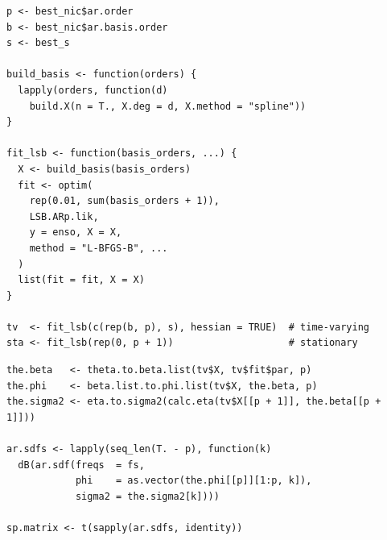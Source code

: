 \documentclass{article}
\begin{document}
\vspace{0.25cm}


\begin{lstlisting}
p <- best_nic$ar.order
b <- best_nic$ar.basis.order
s <- best_s

build_basis <- function(orders) {
  lapply(orders, function(d)
    build.X(n = T., X.deg = d, X.method = "spline"))
}

fit_lsb <- function(basis_orders, ...) {
  X <- build_basis(basis_orders)
  fit <- optim(
    rep(0.01, sum(basis_orders + 1)),
    LSB.ARp.lik,
    y = enso, X = X,
    method = "L-BFGS-B", ...
  )
  list(fit = fit, X = X)
}

tv  <- fit_lsb(c(rep(b, p), s), hessian = TRUE)  # time-varying
sta <- fit_lsb(rep(0, p + 1))                    # stationary
\end{lstlisting}

\vspace{0.25cm}


\begin{lstlisting}
the.beta   <- theta.to.beta.list(tv$X, tv$fit$par, p)
the.phi    <- beta.list.to.phi.list(tv$X, the.beta, p)
the.sigma2 <- eta.to.sigma2(calc.eta(tv$X[[p + 1]], the.beta[[p + 1]]))

ar.sdfs <- lapply(seq_len(T. - p), function(k)
  dB(ar.sdf(freqs  = fs,
            phi    = as.vector(the.phi[[p]][1:p, k]),
            sigma2 = the.sigma2[k])))

sp.matrix <- t(sapply(ar.sdfs, identity))
\end{lstlisting}

\vspace{0.25cm}

\end{document}
